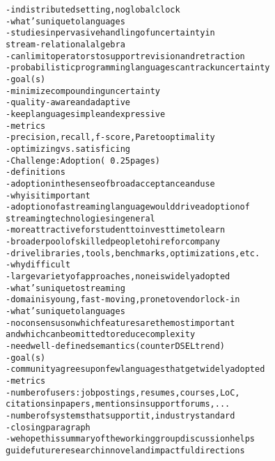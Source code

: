 \begin{alltt}
    - in distributed setting, no global clock~\cite{lamport_1978}
  - what's unique to languages
    - studies in pervasive handling of uncertainty in
      stream-relational algebra \cite{ali_et_al_2009} \cite{tran_et_al_2010}
    - can limit operators to support revision and retraction
    - probabilistic programming languages can track uncertainty~\cite{gordon_et_al_2014}
  - goal(s)
    - minimize compounding uncertainty
    - quality-aware and adaptive
    - keep language simple and expressive
  - metrics
    - precision, recall, f-score, Pareto optimality
    - optimizing vs. satisficing
- Challenge: Adoption (~0.25 pages)
  - definitions
    - adoption in the sense of broad acceptance and use
  - why is it important
    - adoption of a streaming language would drive adoption of
      streaming technologies in general
    - more attractive for student to invest time to learn
    - broader pool of skilled people to hire for company
    - drive libraries, tools, benchmarks, optimizations, etc.
  - why difficult
    - large variety of approaches, none is widely adopted
  - what's unique to streaming
    - domain is young, fast-moving, prone to vendor lock-in
  - what's unique to languages
    - no consensus on which features are the most important
      and which can be omitted to reduce complexity
    - need well-defined semantics (counter DSEL trend)
  - goal(s)
    - community agrees upon few languages that get widely adopted
  - metrics
    - number of users: job postings, resumes, courses, LoC,
      citations in papers, mentions in support forums, ...
    - number of systems that support it, industry standard
- closing paragraph
  - we hope this summary of the working group discussion helps
    guide future research in novel and impactful directions
\end{alltt}
